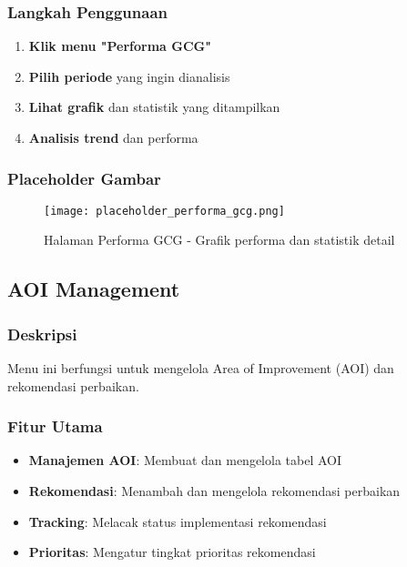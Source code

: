 \documentclass[12pt,a4paper]{article}
\begin{document}
\subsubsection{Langkah Penggunaan}
\begin{enumerate}
    \item \textbf{Klik menu "Performa GCG"}
    \item \textbf{Pilih periode} yang ingin dianalisis
    \item \textbf{Lihat grafik} dan statistik yang ditampilkan
    \item \textbf{Analisis trend} dan performa
\end{enumerate}

\subsubsection{Placeholder Gambar}
\begin{figure}[H]
    \centering
    \texttt{[image: placeholder\_performa\_gcg.png]}
    \caption{Halaman Performa GCG - Grafik performa dan statistik detail}
    \label{fig:performa_gcg}
\end{figure}

\newpage

\subsection{AOI Management}

\subsubsection{Deskripsi}
Menu ini berfungsi untuk mengelola Area of Improvement (AOI) dan rekomendasi perbaikan.

\subsubsection{Fitur Utama}
\begin{itemize}
    \item \textbf{Manajemen AOI}: Membuat dan mengelola tabel AOI
    \item \textbf{Rekomendasi}: Menambah dan mengelola rekomendasi perbaikan
    \item \textbf{Tracking}: Melacak status implementasi rekomendasi
    \item \textbf{Prioritas}: Mengatur tingkat prioritas rekomendasi
\end{itemize}
\end{document}
